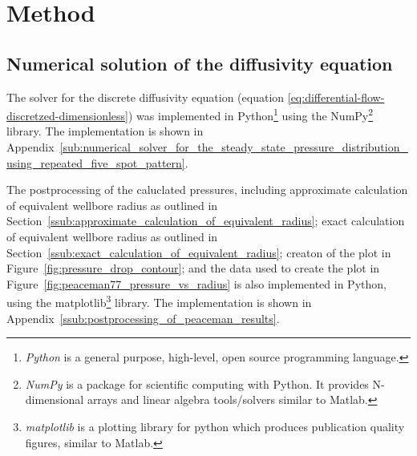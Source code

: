 
\section{Method} %
\label{sec:method}

\subsection{Numerical solution of the diffusivity equation} %
\label{sub:numerical_solution_of_the_diffusivity_equation}
The solver for the discrete diffusivity equation (equation \eqref{eq:differential-flow-discretzed-dimensionless}) was implemented in Python\footnote{\emph{Python} is a general purpose, high-level, open source programming language.} using the NumPy\footnote{\emph{NumPy} is a package for scientific computing with Python. It provides N-dimensional arrays and linear algebra tools/solvers similar to Matlab.} library. The implementation is shown in Appendix~\ref{sub:numerical_solver_for_the_steady_state_pressure_distribution_using_repeated_five_spot_pattern}.

The postprocessing of the caluclated pressures, including approximate calculation of equivalent wellbore radius as outlined in Section~\ref{ssub:approximate_calculation_of_equivalent_radius}; exact calculation of equivalent wellbore radius as outlined in Section~\ref{ssub:exact_calculation_of_equivalent_radius}; creaton of the plot in Figure~\ref{fig:pressure_drop_contour}; and the data used to create the plot in Figure~\ref{fig:peaceman77_pressure_vs_radius} is also implemented in Python, using the matplotlib\footnote{\emph{matplotlib} is a plotting library for python which produces publication quality figures, similar to Matlab.} library. The implementation is shown in Appendix~\ref{ssub:postprocessing_of_peaceman_results}.

